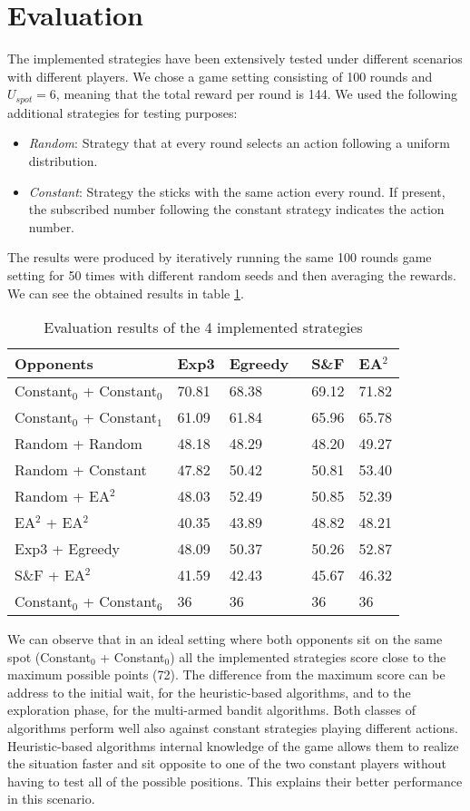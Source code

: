 \documentclass[runningheads]{llncs}
\begin{document}
\section{Evaluation}
The implemented strategies have been extensively tested under
different scenarios with different players. We chose a game setting
consisting of 100 rounds and $U_{spot} = 6$, meaning that the total reward per round
is 144. We used the following additional strategies for testing
purposes:
\begin{itemize}
\item \textit{Random}: Strategy that at every round selects an action
following a uniform distribution.
\item \textit{Constant}: Strategy the sticks with the same action
every round. If present, the subscribed number following the constant
strategy indicates the action number.
\end{itemize}
The results were produced by iteratively running the same 100 rounds game setting
for 50 times with different random seeds and then averaging the
rewards. We can see the obtained results in table \ref{result-table}.
\begin{table}[h!]
\centering
\caption{Evaluation results of the 4 implemented strategies}
\label{result-table}
\begin{tabular}{l|l|l|l|l}
Opponents       & Exp3 \; & Egreedy \, & S\&F \;\; & EA$^2$   \\
\hline
Constant$_0$ + Constant$_0$ \;& 70.81 & 68.38   & 69.12 & 71.82 \\
Constant$_0$ + Constant$_1$ & 61.09 & 61.84   & 65.96 & 65.78 \\
Random + Random  \;   & 48.18 & 48.29   & 48.20 & 49.27 \\
Random + Constant    & 47.82 & 50.42   & 50.81 & 53.40 \\
Random + EA$^2$   & 48.03 & 52.49   & 50.85 & 52.39 \\
EA$^2$ + EA$^2$ & 40.35 & 43.89  & 48.82 & 48.21 \\
Exp3 + Egreedy  & 48.09 & 50.37   & 50.26 & 52.87 \\
S\&F + EA$^2$       & 41.59 & 42.43   & 45.67 & 46.32 \\
Constant$_0$ + Constant$_6$ & 36    & 36      & 36    & 36
\end{tabular}
\end{table}

We can observe that in an ideal setting where both opponents sit on
the same spot (Constant$_0$ + Constant$_0$) all the implemented
strategies score close to the maximum possible points (72). The
difference from the maximum score can be address to the initial
wait, for the heuristic-based algorithms, and to the exploration
phase, for the multi-armed bandit algorithms. Both classes of
algorithms perform well also against constant strategies playing
different actions. Heuristic-based algorithms internal knowledge of
the game allows them to realize the situation faster and sit opposite
to one of the two constant players without having to test all of the
possible positions. This explains their better performance in this
scenario.
\end{document}
